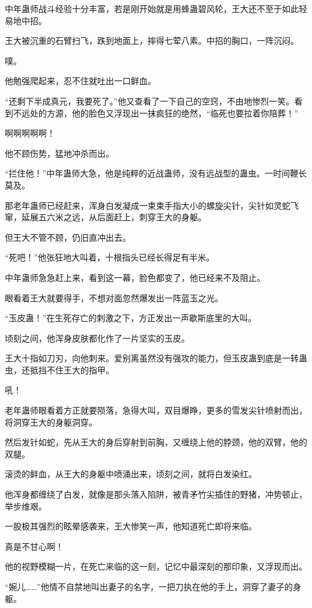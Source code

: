\begin{this_body}
中年蛊师战斗经验十分丰富，若是刚开始就是用蜂蛊碧风轮，王大还不至于如此轻易地中招。

王大被沉重的石臂扫飞，跌到地面上，摔得七荤八素。中招的胸口，一阵沉闷。

噗。

他勉强爬起来，忍不住就吐出一口鲜血。

“还剩下半成真元，我要死了。”他又查看了一下自己的空窍，不由地惨烈一笑。看到不远处的方源，他的脸色又浮现出一抹疯狂的绝然，“临死也要拉着你陪葬！”

啊啊啊啊啊！

他不顾伤势，猛地冲杀而出。

“拦住他！”中年蛊师大急，他是纯粹的近战蛊师，没有远战型的蛊虫。一时间鞭长莫及。

那老年蛊师已经赶来，浑身白发凝成一束束手指大小的螺旋尖针，尖针如灵蛇飞窜，延展五六米之远，从后面赶上，刺穿王大的身躯。

但王大不管不顾，仍旧直冲出去。

“死吧！”他张狂地大叫着，十根指头已经长得足有半米。

中年蛊师急急赶上来，看到这一幕，脸色都变了，他已经来不及阻止。

眼看着王大就要得手，不想对面忽然爆发出一阵蓝玉之光。

“玉皮蛊！”在生死存亡的刺激之下，方正发出一声歇斯底里的大叫。

顷刻之间，他浑身皮肤都化作了一片坚实的玉皮。

王大十指如刀刃，向他刺来。爱别离虽然没有强攻的能力，但玉皮蛊到底是一转蛊虫，还抵挡不住王大的指甲。

吼！

老年蛊师眼看着方正就要陨落，急得大叫，双目爆睁，更多的雪发尖针喷射而出，将洞穿王大的身躯洞穿。

然后发针如蛇，先从王大的身后穿射到前胸，又缠绕上他的脖颈，他的双臂，他的双腿。

滚烫的鲜血，从王大的身躯中喷涌出来，顷刻之间，就将白发染红。

他浑身都缠绕了白发，就像是那头落入陷阱，被青矛竹尖插住的野猪，冲势顿止，举步维艰。

一股极其强烈的眩晕感袭来，王大惨笑一声，他知道死亡即将来临。

真是不甘心啊！

他的视野模糊一片，在死亡来临的这一刻，记忆中最深刻的那印象，又浮现而出。

“婉儿……”他情不自禁地叫出妻子的名字，一把刀执在他的手上，洞穿了妻子的身躯。


\end{this_body}
